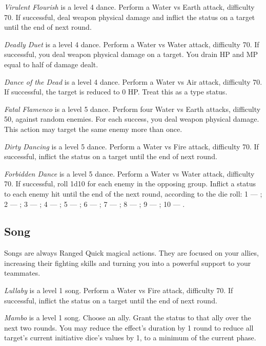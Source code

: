 \begin{multicols}{2}
    \textit{Virulent Flourish} is a level 4 dance. Perform a Water vs Earth attack, difficulty 70. If successful, deal weapon physical damage and inflict the  status on a target until the end of next round.
    
    \textit{Deadly Duet} is a level 4 dance. Perform a Water vs Water attack, difficulty 70. If successful, you deal weapon physical damage on a target. You drain HP and MP equal to half of damage dealt.
    
    \textit{Dance of the Dead} is a level 4 dance. Perform a Water vs Air attack, difficulty 70. If successful, the target is reduced to 0 HP\@. Treat this as a  type status.
    
    \textit{Fatal Flamenco} is a level 5 dance. Perform four Water vs Earth attacks, difficulty 50, against random enemies. For each success, you deal weapon physical damage. This action may target the same enemy more than once.
    
    \textit{Dirty Dancing} is a level 5 dance. Perform a Water vs Fire attack, difficulty 70. If successful, inflict the  status on a target until the end of next round.
    
    \textit{Forbidden Dance} is a level 5 dance. Perform a Water vs Water attack, difficulty 70. If successful, roll 1d10 for each enemy in the opposing group. Inflict a status to each enemy hit until the end of the next round, according to the die roll: 1 --- ; 2 --- ; 3 --- ; 4 --- ; 5 --- ; 6 --- ; 7 --- ; 8 --- ; 9 --- ; 10 --- .
    

    \subsection{Song}\label{subsec:perf-song}

    Songs are always Ranged Quick magical actions. They are focused on your allies, increasing their fighting skills and turning you into a powerful support to your teammates.
    
    \textit{Lullaby} is a level 1 song. Perform a Water vs Fire attack, difficulty 70. If successful, inflict the  status on a target until the end of next round.
    
    \textit{Mambo} is a level 1 song. Choose an ally. Grant the  status to that ally over the next two rounds. You may reduce the effect's duration by 1 round to reduce all target's current initiative dice's values by 1, to a minimum of the current phase.
    

\end{multicols}
